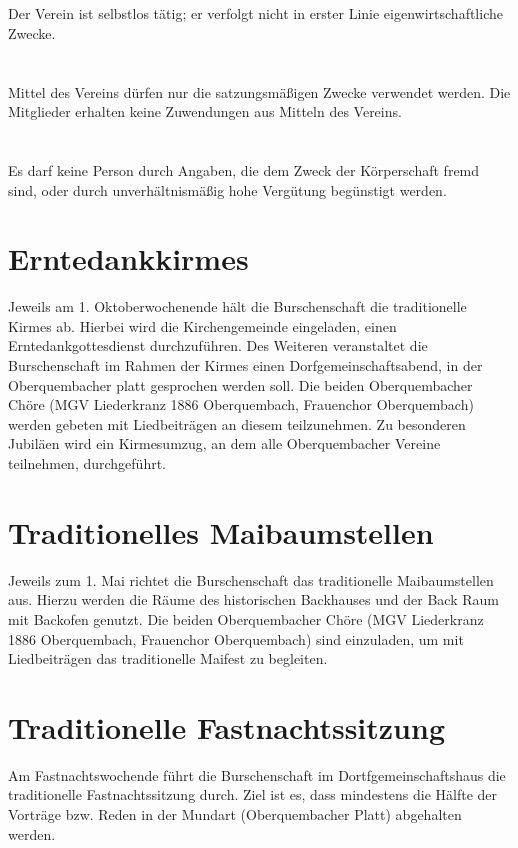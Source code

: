 \section{}
Der Verein ist selbstlos tätig; er verfolgt nicht in erster Linie eigenwirtschaftliche Zwecke.

\section{}
Mittel des Vereins dürfen nur die satzungsmäßigen Zwecke verwendet werden. Die Mitglieder erhalten keine Zuwendungen aus Mitteln des Vereins.

\section{}
Es darf keine Person durch Angaben, die dem Zweck der Körperschaft fremd sind, oder durch unverhältnismäßig hohe Vergütung begünstigt werden.

\section{Erntedankkirmes}	
Jeweils am 1. Oktoberwochenende hält die Burschenschaft die traditionelle Kirmes ab. Hierbei wird die Kirchengemeinde eingeladen, einen Erntedankgottesdienst durchzuführen. Des Weiteren veranstaltet die Burschenschaft im Rahmen der Kirmes einen Dorfgemeinschaftsabend, in der Oberquembacher platt gesprochen werden soll. Die beiden Oberquembacher Chöre (MGV Liederkranz 1886 Oberquembach, Frauenchor Oberquembach) werden gebeten mit Liedbeiträgen an diesem teilzunehmen. Zu besonderen Jubiläen wird ein Kirmesumzug, an dem alle Oberquembacher Vereine teilnehmen, durchgeführt.

\section{Traditionelles Maibaumstellen}
Jeweils zum 1. Mai richtet die Burschenschaft das traditionelle Maibaumstellen aus. Hierzu werden die Räume des historischen Backhauses und der Back Raum mit Backofen genutzt. Die beiden Oberquembacher Chöre (MGV Liederkranz 1886 Oberquembach, Frauenchor Oberquembach) sind einzuladen, um mit Liedbeiträgen das traditionelle Maifest zu begleiten.

\section{Traditionelle Fastnachtssitzung}
Am Fastnachtswochende  führt die Burschenschaft im Dortfgemeinschaftshaus die traditionelle Fastnachtssitzung durch. Ziel ist es, dass mindestens  die Hälfte der Vorträge bzw. Reden in der Mundart (Oberquembacher Platt) abgehalten werden.

